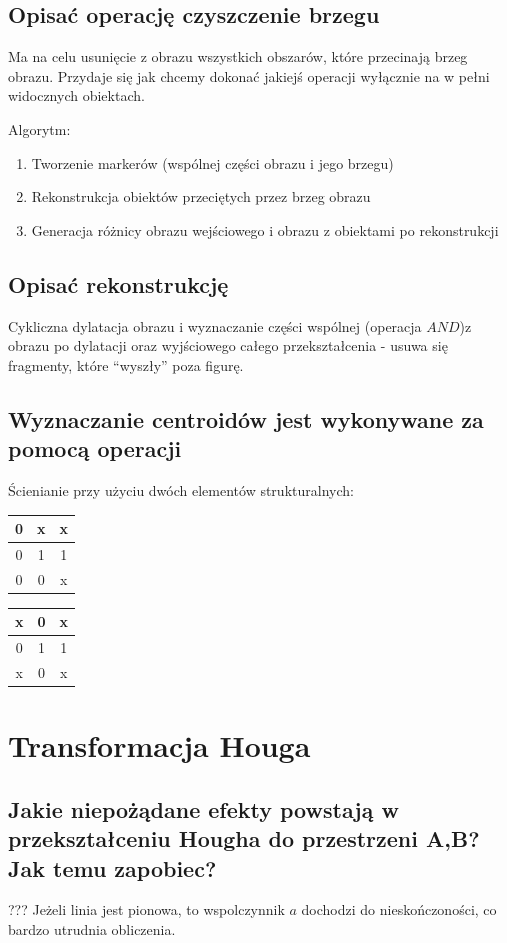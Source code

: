 \documentclass[a4paper, 12pt, titlepage]{article}
\begin{document}
\subsection{Opisać operację czyszczenie brzegu}
Ma na celu usunięcie z obrazu wszystkich obszarów, które przecinają brzeg obrazu. Przydaje się jak chcemy dokonać jakiejś operacji wyłącznie na w pełni widocznych obiektach. \par
Algorytm:
\begin{enumerate}[noitemsep]
	\item Tworzenie markerów (wspólnej części obrazu i jego brzegu)
	\item Rekonstrukcja obiektów przeciętych przez brzeg obrazu
	\item Generacja różnicy obrazu wejściowego i obrazu z obiektami po rekonstrukcji
\end{enumerate}

\subsection{Opisać rekonstrukcję}
Cykliczna dylatacja obrazu i wyznaczanie części wspólnej (operacja $AND$)z obrazu po dylatacji oraz wyjściowego całego przekształcenia - usuwa się fragmenty, które “wyszły” poza figurę.

\subsection{Wyznaczanie centroidów jest wykonywane za pomocą operacji}
Ścienianie przy użyciu dwóch elementów strukturalnych:
\begin{tabular}{|c|c|c|}
	\hline
	0 & x & x \\ \hline
	0 & 1 & 1 \\ \hline
	0 & 0 & x \\ \hline
\end{tabular} 
\begin{tabular}{|c|c|c|}
	\hline
	x & 0 & x \\ \hline
	0 & 1 & 1 \\ \hline
	x & 0 & x \\ \hline
\end{tabular} 

\pagebreak\section{Transformacja Houga}
\subsection{Jakie niepożądane efekty powstają w przekształceniu Hougha do przestrzeni A,B? Jak temu zapobiec?} ???
Jeżeli linia jest pionowa, to wspolczynnik $a$ dochodzi do nieskończoności, co bardzo utrudnia obliczenia.
\end{document}
